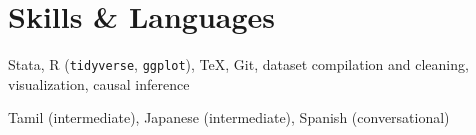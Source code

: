 \documentclass[11pt]{article}
\begin{document}
\section{Skills \& Languages}
\begin{description}[itemsep=0pt]
	\item[Technical \& Data] Stata, R (\texttt{tidyverse}, \texttt{ggplot}), \TeX, Git, dataset compilation and cleaning, visualization, causal inference
	\item[Languages] Tamil (intermediate), Japanese (intermediate), Spanish (conversational)
\end{description}
\end{document}
